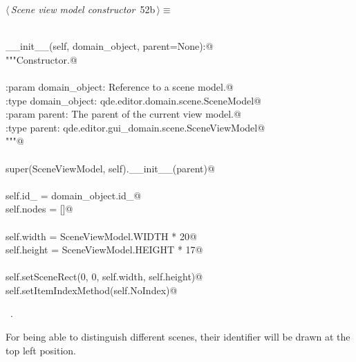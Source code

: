 \documentclass[
    a4paper,      %
    10pt,         %
    openright,    %
    notitlepage,  %
    parskip=half, %
]{scrreprt}       %
\theoremstyle{definition}                    %
\begin{document}
\begin{flushleft} \small
\begin{minipage}{\linewidth}\label{scrap81}\raggedright\small
{} $\langle\,${\itshape Scene view model constructor}\nobreak\ {\footnotesize {52b}}$\,\rangle\equiv$
\vspace{-1exm}
\begin{list}{}{} \item
\mbox{}\lstinline@@\\
\mbox{}\lstinline@def __init__(self, domain_object, parent=None):@\\
\mbox{}\lstinline@   """Constructor.@\\
\mbox{}\lstinline@@\\
\mbox{}\lstinline@   :param domain_object: Reference to a scene model.@\\
\mbox{}\lstinline@   :type  domain_object: qde.editor.domain.scene.SceneModel@\\
\mbox{}\lstinline@   :param parent:        The parent of the current view model.@\\
\mbox{}\lstinline@   :type parent:         qde.editor.gui_domain.scene.SceneViewModel@\\
\mbox{}\lstinline@   """@\\
\mbox{}\lstinline@@\\
\mbox{}\lstinline@   super(SceneViewModel, self).__init__(parent)@\\
\mbox{}\lstinline@@\\
\mbox{}\lstinline@   self.id_ = domain_object.id_@\\
\mbox{}\lstinline@   self.nodes = []@\\
\mbox{}\lstinline@@\\
\mbox{}\lstinline@   self.width = SceneViewModel.WIDTH * 20@\\
\mbox{}\lstinline@   self.height = SceneViewModel.HEIGHT * 17@\\
\mbox{}\lstinline@@\\
\mbox{}\lstinline@   self.setSceneRect(0, 0, self.width, self.height)@\\
\mbox{}\lstinline@   self.setItemIndexMethod(self.NoIndex)@\\
\mbox{}\lstinline@@{\NWsep}
\end{list}
\vspace{-1.5ex}
\footnotesize
\begin{list}{}{\setlength{\itemsep}{-\parsep}\setlength{\itemindent}{-\leftmargin}}
\item \NWtxtMacroRefIn\ .

\item{}
\end{list}
\end{minipage}\vspace{4ex}
\end{flushleft}
For being able to distinguish different scenes, their identifier will be drawn
at the top left position.
\end{document}
